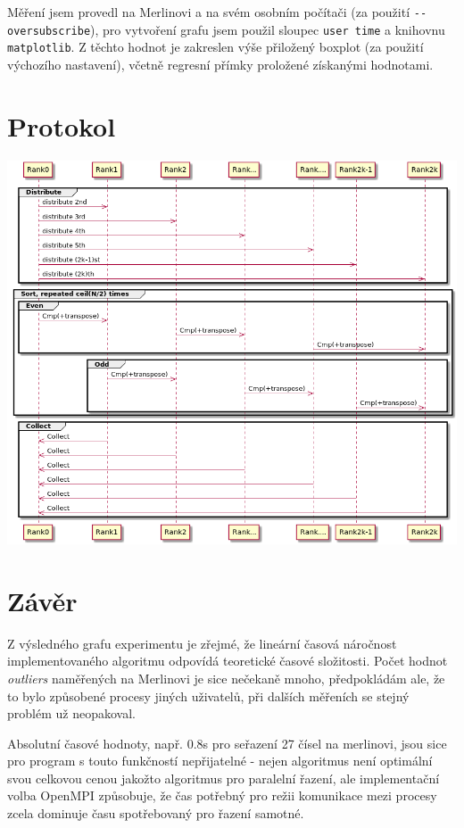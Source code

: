 \documentclass[11pt]{article}
\begin{document}
Měření jsem provedl na Merlinovi a na svém osobním počítači (za použití
\texttt{-{}-oversubscribe}), pro vytvoření grafu jsem použil sloupec \texttt{user time} a knihovnu
\texttt{matplotlib}. Z těchto hodnot je zakreslen výše přiložený boxplot (za použití
výchozího nastavení), včetně regresní přímky proložené získanými hodnotami.

\section{Protokol}
\label{sec:orgdb8d12e}
\begin{center}
\includegraphics[width=.9\linewidth]{odd-even.png}
\end{center}

\section{Závěr}
\label{sec:orgf770d37}
Z výsledného grafu experimentu je zřejmé, že lineární časová náročnost
implementovaného algoritmu odpovídá teoretické časové složitosti. Počet hodnot
\emph{outliers} naměřených na Merlinovi je sice nečekaně mnoho, předpokládám ale, že to
bylo způsobené procesy jiných uživatelů, při dalších měřeních se stejný problém
už neopakoval.

Absolutní časové hodnoty, např. 0.8s pro seřazení 27 čísel na merlinovi, jsou
sice pro program s touto funkčností nepřijatelné - nejen algoritmus není
optimální svou celkovou cenou jakožto algoritmus pro paralelní řazení, ale
implementační volba OpenMPI způsobuje, že čas potřebný pro režii komunikace mezi
procesy zcela dominuje času spotřebovaný pro řazení samotné.
\end{document}
